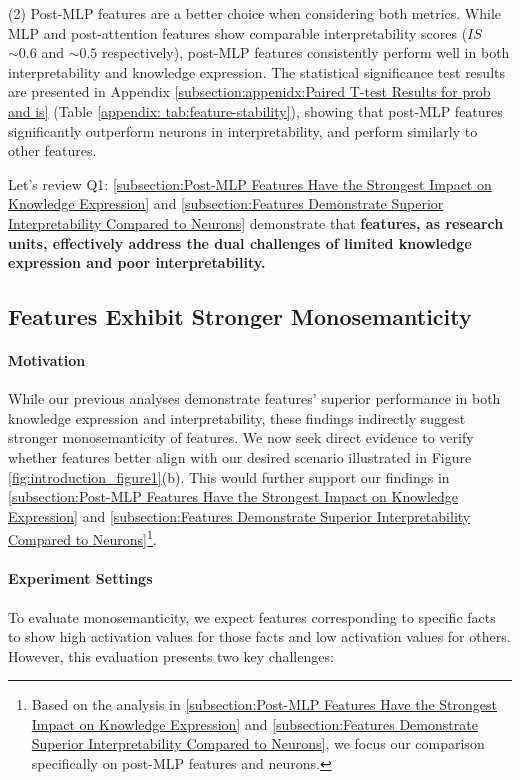 (2) {Post-MLP features are a better choice when considering both metrics.} While MLP and post-attention features show comparable interpretability scores ($IS$ $\sim0.6$ and $\sim0.5$ respectively), post-MLP features consistently perform well in both interpretability and knowledge expression. The statistical significance test results are presented in Appendix \ref{subsection:appenidx:Paired T-test Results for prob and is} (Table \ref{appendix: tab:feature-stability}), showing that post-MLP features significantly outperform neurons in interpretability, and perform similarly to other features.

Let's review Q1: \textsection\ref{subsection:Post-MLP Features Have the Strongest Impact on Knowledge Expression} and \textsection\ref{subsection:Features Demonstrate Superior Interpretability Compared to Neurons} demonstrate that \textbf{features, as research units, effectively address the dual challenges of limited knowledge expression and poor interpretability.}

\subsection{Features Exhibit Stronger Monosemanticity}
\label{subsection: Features Exhibit Stronger Monosemanticity}
\paragraph{Motivation}
While our previous analyses demonstrate features' superior performance in both knowledge expression and interpretability, these findings indirectly suggest stronger monosemanticity of features. We now seek direct evidence to verify whether features better align with our desired scenario illustrated in Figure \ref{fig:introduction_figure1}(b). This would further support our findings in \textsection\ref{subsection:Post-MLP Features Have the Strongest Impact on Knowledge Expression} and \textsection\ref{subsection:Features Demonstrate Superior Interpretability Compared to Neurons}\footnote{Based on the analysis in \textsection\ref{subsection:Post-MLP Features Have the Strongest Impact on Knowledge Expression} and \textsection\ref{subsection:Features Demonstrate Superior Interpretability Compared to Neurons}, we focus our comparison specifically on post-MLP features and neurons.}.

\paragraph{Experiment Settings} To evaluate monosemanticity, we expect features corresponding to specific facts to show high activation values for those facts and low activation values for others. However, this evaluation presents two key challenges:

